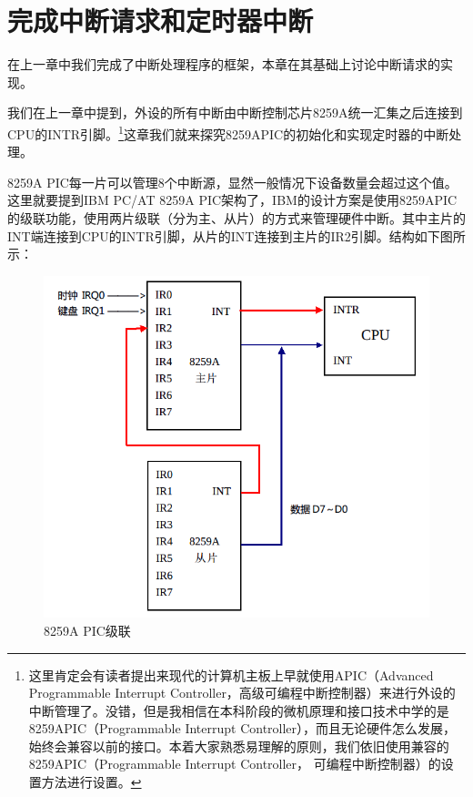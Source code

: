 
\section {完成中断请求和定时器中断}

\par 在上一章中我们完成了中断处理程序的框架，本章在其基础上讨论中断请求的实现。

\par 我们在上一章中提到，外设的所有中断由中断控制芯片8259A统一汇集之后连接到CPU的INTR引脚。\footnote{这里肯定会有读者提出来现代的计算机主板上早就使用APIC（Advanced Programmable Interrupt Controller，高级可编程中断控制器）来进行外设的中断管理了。没错，但是我相信在本科阶段的微机原理和接口技术中学的是8259APIC（Programmable Interrupt Controller），而且无论硬件怎么发展，始终会兼容以前的接口。本着大家熟悉易理解的原则，我们依旧使用兼容的8259APIC（Programmable Interrupt Controller， 可编程中断控制器）的设置方法进行设置。}这章我们就来探究8259APIC的初始化和实现定时器的中断处理。

\par 8259A PIC每一片可以管理8个中断源，显然一般情况下设备数量会超过这个值。这里就要提到IBM PC/AT 8259A PIC架构了，IBM的设计方案是使用8259APIC的级联功能，使用两片级联（分为主、从片）的方式来管理硬件中断。其中主片的INT端连接到CPU的INTR引脚，从片的INT连接到主片的IR2引脚。结构如下图所示：
\begin{figure}[ht]
      \centering
      \includegraphics[scale=0.5]{picture/chapt8/8259A_PIC.png}
      \caption{8259A PIC级联}
\end{figure}

